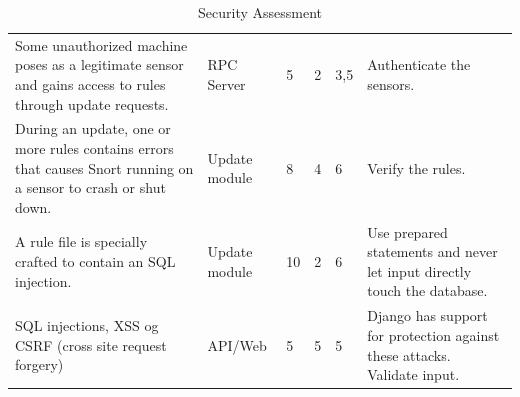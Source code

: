 \begin{table}[h]
\begin{tabular}{p{4cm}|p{2cm}|p{1cm}|p{1cm}|p{1cm}|p{4cm}}
	{Some unauthorized machine poses as a legitimate sensor
	and gains access to rules through update requests.} & {RPC Server} & {5} & {2} & {3,5} & {Authenticate the sensors.} \\
	{During an update, one or more rules contains errors
	that causes Snort running on a sensor to crash or shut down.} & {Update module} & {8} & {4} & {6} & {Verify the rules.} \\
	{A rule file is specially crafted to contain an SQL
	injection.} & {Update module} & {10} & {2} & {6} & {Use prepared statements and never let input directly touch the database.} \\
	{SQL injections, XSS og CSRF (cross site request
	forgery)} & {API/Web} & {5} & {5} & {5} & {Django has support for protection against these attacks. Validate input.} \\
	\hline
  \end{tabular}\hspace*{-4cm}
  \caption{Security Assessment}
  \label{tab:security_assessment}
\end{table}